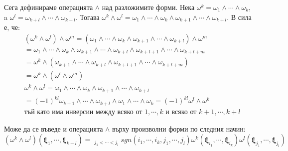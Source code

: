 \documentclass[12pt]{article}
\newcommand\myxi[0]{\boldsymbol{\xi}}
\begin{document}
\begin{large}
  Сега дефинираме операцията $\wedge$ над разложимите форми. Нека $\omega^k=\omega_1 \wedge \cdots \wedge \omega_k$, a $\omega^l=\omega_{k+l} \wedge \cdots \wedge \omega_{k+l}$. Тогава $\omega^k \wedge \omega^l = \omega_1 \wedge \cdots \wedge \omega_k \wedge \omega_{k+1} \wedge \cdots \wedge \omega_{k+l}$. В сила е, че:
  \begin{align*}
    &(\omega^k \wedge \omega^l) \wedge \omega^m = (\omega_1 \wedge \cdots \wedge \omega_k \wedge \omega_{k+1} \wedge \cdots \wedge \omega_{k+l}) \wedge \omega^m \\
    &=\omega_1 \wedge \cdots \wedge \omega_k \wedge \omega_{k+1} \wedge \cdots \wedge \omega_{k+l} \wedge \omega_{k+l+1} \wedge \cdots \wedge \omega_{k+l+m} \\
    &= \omega^k \wedge (\omega_{k+1} \wedge \cdots \wedge \omega_{k+l} \wedge \omega_{k+l+1} \wedge \cdots \wedge \omega_{k+l+m}) \\
    &=\omega^k \wedge (\omega^l \wedge \omega^m) \\[20pt]
    &\omega^k \wedge \omega^l=\omega_1 \wedge \cdots \wedge \omega_k \wedge \omega_{k+1} \wedge \cdots \wedge \omega_{k+l} \\
    &=(-1)^{kl}\omega_{k+1} \wedge \cdots \wedge \omega_{k+l} \wedge \omega_1 \wedge \cdots \wedge \omega_k = (-1)^{kl} \omega^l \wedge \omega^k \\
    &\text{тъй като има инверсии между всяко от $1,\cdots,k$ и всяко от $k+1,\cdots,k+l$}
  \end{align*}

  Може да се въведе и операцията $\wedge$ върху произволни форми по следния начин:
  \[
    (\omega^k \wedge \omega^l)(\myxi_1,\cdots,\myxi_{k+l})=\mathop{\sum_{i_1<\cdots<i_k}}_{j_1<\cdots<j_l}sgn(i_1,\cdots,i_k,j_1, \cdots,j_l) \omega^k(\myxi_{i_1},\cdots,\myxi_{i_k})\omega^l(\myxi_{j_1},\cdots,\myxi_{j_l})
  \]


\end{large}
\end{document}
